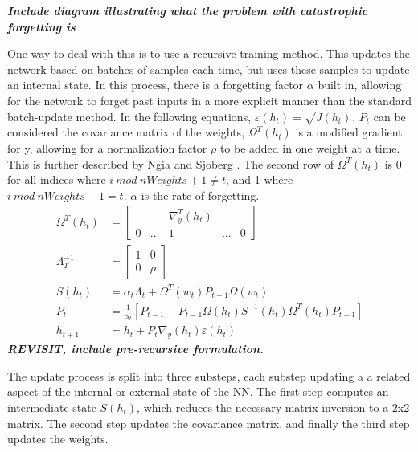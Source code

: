 \documentclass[11pt]{report}
\begin{document}
	\par \textbf{\textit{Include diagram illustrating what the problem with catastrophic forgetting is}}
	\par One way to deal with this is to use a recursive training method. This updates the network based on batches of samples each time, but uses these samples to update an internal state. In this process, there is a forgetting factor $\alpha$ built in, allowing for the network to forget past inputs in a more explicit manner than the standard batch-update method. In the following equations, $\varepsilon(h_t) = \sqrt{J(h_t)}$, $P_t$ can be considered the covariance matrix of the weights, $\Omega^T(h_t)$ is a modified gradient for y, allowing for a normalization factor $\rho$ to be added in one weight at a time. This is further described by Ngia and Sjoberg \cite{bg:rlm_establish}. The second row of $\Omega^T(h_t)$ is 0 for all indices where $i\ mod\ nWeights+1 \neq t$, and 1 where $i\ mod\ nWeights+1 = t$. $\alpha$ is the rate of forgetting. 
	\begin{align}
		\Omega^T(h_t) &= \begin{bmatrix}
			&& \nabla_y^T(h_t) && \\ 0 & ... & 1 & ... & 0
		\end{bmatrix} \\
		\Lambda_{T}^{-1} &= \begin{bmatrix}
			1&0\\0&\rho
		\end{bmatrix} \\
		S(h_t) &= \alpha_t\Lambda_t + \Omega^T(w_t)P_{t-1}\Omega(w_t) \\
		P_t &= \frac{1}{\alpha_t}[P_{t-1}-P_{t-1}\Omega(h_t)S^{-1}(h_t)\Omega^T(h_t)P_{t-1}]\\
		h_{t+1} &= h_t + P_t \nabla_y(h_t)\varepsilon(h_t) 
	\end{align}
		\textbf{\textit{REVISIT, include pre-recursive formulation.}}
	\par The update process is split into three substeps, each substep updating a a related aspect of the internal or external state of the NN. The first step computes an intermediate state $S(h_t)$, which reduces the necessary matrix inversion to a 2x2 matrix. The second step updates the covariance matrix, and finally the third step updates the weights. 
\end{document}
